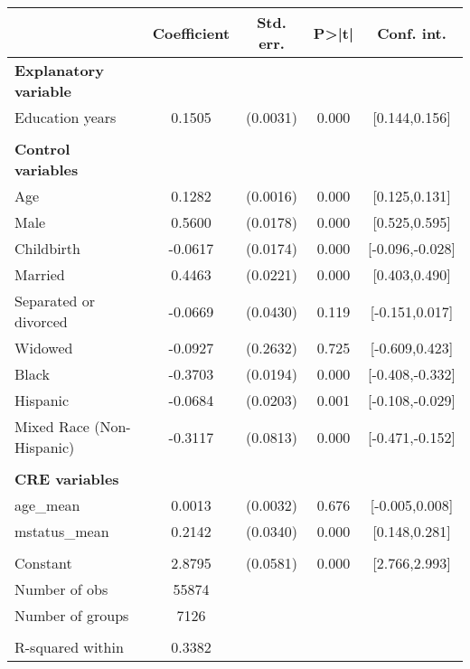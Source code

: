 {
\def\sym#1{\ifmmode^{#1}\else\(^{#1}\)\fi}
\begin{tabular}{l*{1}{cccc}}
\toprule
                    & Coefficient&   Std. err.&       P>|t|&  Conf. int.\\
\midrule
\textbf{Explanatory variable}&            &            &            &            \\
Education years     &      0.1505&    (0.0031)&       0.000&[0.144,0.156]\\
\\ \textbf{Control variables}&            &            &            &            \\
Age                 &      0.1282&    (0.0016)&       0.000&[0.125,0.131]\\
Male                &      0.5600&    (0.0178)&       0.000&[0.525,0.595]\\
Childbirth          &     -0.0617&    (0.0174)&       0.000&[-0.096,-0.028]\\
Married             &      0.4463&    (0.0221)&       0.000&[0.403,0.490]\\
Separated or divorced&     -0.0669&    (0.0430)&       0.119&[-0.151,0.017]\\
Widowed             &     -0.0927&    (0.2632)&       0.725&[-0.609,0.423]\\
Black               &     -0.3703&    (0.0194)&       0.000&[-0.408,-0.332]\\
Hispanic            &     -0.0684&    (0.0203)&       0.001&[-0.108,-0.029]\\
Mixed Race (Non-Hispanic)&     -0.3117&    (0.0813)&       0.000&[-0.471,-0.152]\\
\\ \textbf{CRE variables}&            &            &            &            \\
age\_mean            &      0.0013&    (0.0032)&       0.676&[-0.005,0.008]\\
mstatus\_mean        &      0.2142&    (0.0340)&       0.000&[0.148,0.281]\\
                    &            &            &            &            \\
Constant            &      2.8795&    (0.0581)&       0.000&[2.766,2.993]\\
\midrule
Number of obs       &       55874&            &            &            \\
Number of groups    &        7126&            &            &            \\
\\ R-squared within &      0.3382&            &            &            \\

\end{tabular}}
